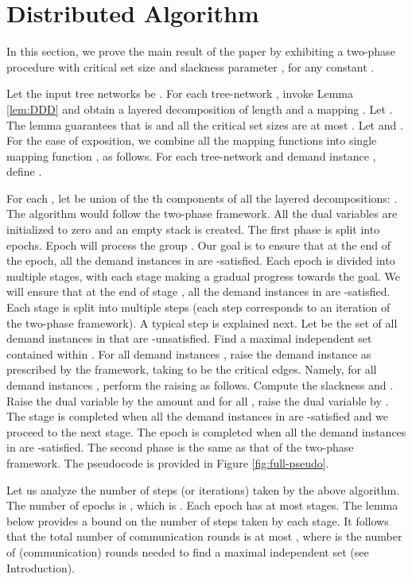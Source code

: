\documentclass[11pt]{article}
\begin{document}
\section{Distributed Algorithm}
\label{sec:distributed}
In this section, we prove the main result of the paper by exhibiting
a two-phase procedure with critical set size 
 and slackness parameter , for any constant .

Let the input tree networks be .
For each tree-network , invoke Lemma \ref{lem:DDD} and obtain a layered decomposition
 of length  and a mapping .
Let . The lemma guarantees that  is 
and all the critical set sizes are at most . 
Let  and .
For the ease of exposition,
we combine all the mapping functions into single mapping function , as follows.
For each tree-network  and demand instance , define .

For each , let  be union of the th components
of all the layered decompositions: .
The algorithm would follow the two-phase framework.
All the dual variables are initialized to zero and an empty stack is created.
The first phase is split into  epochs.
Epoch  will process the group . Our goal is to ensure that at the end of the epoch,
all the demand instances in  are -satisfied.
Each epoch is divided into multiple stages, with each stage making a gradual progress towards the goal.
We will ensure that at the end of stage , all the demand instances in  are -satisfied.
Each stage is split into multiple steps (each step corresponds to an iteration of the two-phase framework).
A typical step is explained next.
Let  be the set of all demand instances in  that are -unsatisfied.
Find a maximal independent set  contained within .
For all demand instances , raise the demand instance  as prescribed by the framework,
taking  to be the critical edges.
Namely, for all demand instances , perform the raising as follows.
Compute the slackness 
and . Raise the dual variable  by the amount 
and for all , raise the dual variable  by .
The stage is completed when all the demand instances in  are -satisfied
and we proceed to the next stage. The epoch is completed when all the demand instances in 
are -satisfied. The second phase is the same as that of the two-phase framework.
The pseudocode is provided in Figure \ref{fig:full-pseudo}. 


Let us analyze the number of steps (or iterations) taken by the above algorithm.
The number of epochs is , which is .
Each epoch has at most  stages.
The lemma below provides a bound on the number of steps taken by each stage.
It follows that the total number of communication rounds
is at most ,
where  is the number of (communication) rounds needed to find a maximal independent set (see Introduction).
\end{document}
